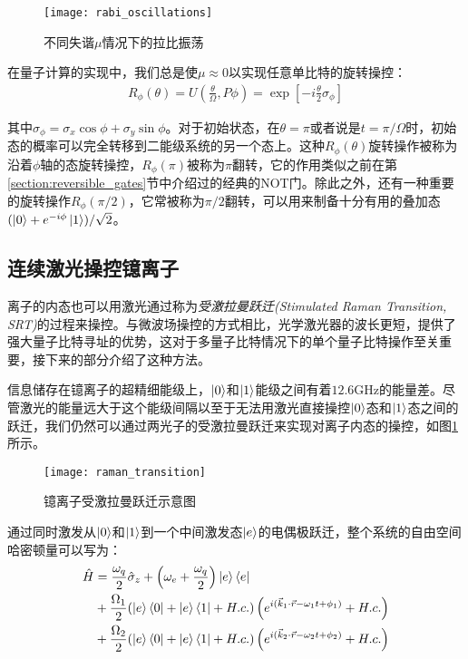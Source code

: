 \begin{figure}
    \centering
    \caption[不同失谐$\mu$情况下的拉比振荡]{不同失谐$\mu$情况下的拉比振荡\cite[]{Lu_2019}}
    \texttt{[image: rabi\_oscillations]}
\end{figure}

在量子计算的实现中，我们总是使$\mu\approx0$以实现任意单比特的旋转操控：
\begin{align}
    R_\phi(\theta)=U\left(\frac{\theta}{\Omega},P\phi\right)=\exp[-i\frac{\theta}{2}\sigma_\phi]
\end{align}

其中$\sigma_\phi=\sigma_x\cos{\phi}+\sigma_y\sin{\phi}$。对于初始状态，在$\theta=\pi$或者说是$t=\pi/\Omega$时，初始态的概率可以完全转移到二能级系统的另一个态上。这种$R_\phi(\theta)$旋转操作被称为沿着$\phi$轴的态旋转操控，$R_\phi(\pi)$被称为$\pi$翻转，它的作用类似之前在第\ref{section:reversible_gates}节中介绍过的经典的NOT门。除此之外，还有一种重要的旋转操作$R_\phi(\pi/2)$，它常被称为$\pi/2$翻转，可以用来制备十分有用的叠加态$(\ket{0}+e^{-i\phi}\ket{1})/\sqrt{2}$。



\subsection[连续激光操控镱离子]{连续激光操控镱离子\label{section:raman_transition}}

离子的内态也可以用激光通过称为\emph{受激拉曼跃迁(Stimulated Raman Transition, SRT)}的过程来操控。与微波场操控的方式相比，光学激光器的波长更短，提供了强大量子比特寻址的优势，这对于多量子比特情况下的单个量子比特操作至关重要，接下来的部分介绍了这种方法。

信息储存在镱离子的超精细能级上，$\ket{0}$和$\ket{1}$能级之间有着$12.6$GHz的能量差。尽管激光的能量远大于这个能级间隔以至于无法用激光直接操控$\ket{0}$态和$\ket{1}$态之间的跃迁，我们仍然可以通过两光子的受激拉曼跃迁来实现对离子内态的操控，如图\ref{fig:raman_transition}所示。
\begin{figure}
    \centering
    \caption[镱离子受激拉曼跃迁示意图]{镱离子受激拉曼跃迁示意图\label{fig:raman_transition}}
    \texttt{[image: raman\_transition]}
\end{figure}

通过同时激发从$\ket{0}$和$\ket{1}$到一个中间激发态$\ket{e}$的电偶极跃迁，整个系统的自由空间哈密顿量可以写为：
\begin{align}
    \hat{H}&=\frac{\omega_q}{2}\hat{\sigma}_z+\left(\omega_e+\frac{\omega_q}{2}\right)\ket{e}\bra{e}\\
    &+\frac{\Omega_1}{2}(\ket{e}\bra{0}+\ket{e}\bra{1}+H.c.)\left(e^{i(\vec{k}_1\cdot\vec{r}-\omega_1t+\phi_1)}+H.c.\right)\\
    &+\frac{\Omega_2}{2}(\ket{e}\bra{0}+\ket{e}\bra{1}+H.c.)\left(e^{i(\vec{k}_2\cdot\vec{r}-\omega_2t+\phi_2)}+H.c.\right)
\end{align}


